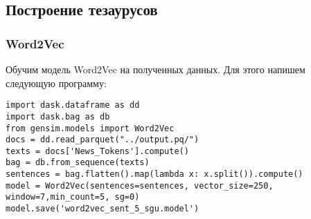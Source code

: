 \documentclass[coursework]{SCWorks}
\begin{document}
\subsection{Построение тезаурусов}
\subsubsection{Word2Vec}
Обучим модель Word2Vec на полученных данных. Для этого напишем следующую программу:
\begin{verbatim}
import dask.dataframe as dd
import dask.bag as db
from gensim.models import Word2Vec
docs = dd.read_parquet("../output.pq/")
texts = docs['News_Tokens'].compute()
bag = db.from_sequence(texts)
sentences = bag.flatten().map(lambda x: x.split()).compute()
model = Word2Vec(sentences=sentences, vector_size=250, window=7,min_count=5, sg=0)
model.save('word2vec_sent_5_sgu.model')
\end{verbatim}
\end{document}
